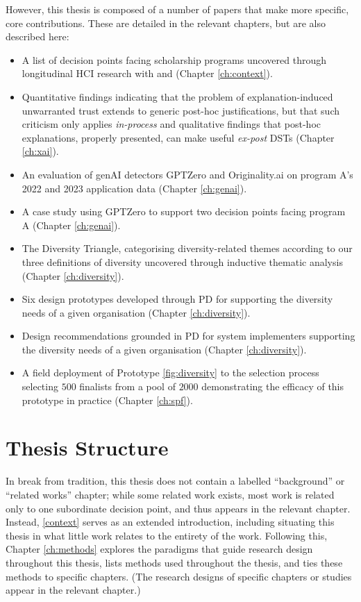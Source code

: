 However, this thesis is composed of a number of papers that make more specific, core contributions. These are detailed in the relevant chapters, but are also described here:

\begin{itemize}
    \item A list of decision points facing scholarship programs uncovered through longitudinal HCI research with \rise and \eit (Chapter \ref{ch:context}).
    \item Quantitative findings indicating that the problem of explanation-induced unwarranted trust extends to generic post-hoc justifications, but that such criticism only applies \emph{in-process} and qualitative findings that post-hoc explanations, properly presented, can make useful \emph{ex-post} DSTs (Chapter \ref{ch:xai}).
    \item An evaluation of genAI detectors GPTZero and Originality.ai on program A's 2022 and 2023 application data (Chapter \ref{ch:genai}).
    \item A case study using GPTZero to support two decision points facing program A (Chapter \ref{ch:genai}).
    \item The Diversity Triangle, categorising diversity-related themes according to our three definitions of diversity uncovered through inductive thematic analysis (Chapter \ref{ch:diversity}).
    \item Six design prototypes developed through PD for supporting the diversity needs of a given organisation (Chapter \ref{ch:diversity}).
    \item Design recommendations grounded in PD for system implementers supporting the diversity needs of a given organisation (Chapter \ref{ch:diversity}).
    \item A field deployment of Prototype \ref{fig:diversity} to the \rise selection process selecting $500$ finalists from a pool of $2000$ demonstrating the efficacy of this prototype in practice (Chapter \ref{ch:spf}).
\end{itemize}

\section{Thesis Structure}
In break from tradition, this thesis does not contain a labelled ``background'' or ``related works'' chapter; while some related work exists, most work is related only to one subordinate decision point, and thus appears in the relevant chapter. Instead, \Chapter \ref{context} serves as an extended introduction, including situating this thesis in what little work relates to the entirety of the work. Following this, Chapter \ref{ch:methods} explores the paradigms that guide research design throughout this thesis, lists methods used throughout the thesis, and ties these methods to specific chapters. (The research designs of specific chapters or studies appear in the relevant chapter.)

